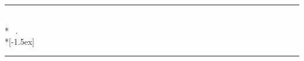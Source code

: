 

{\topsep}{\topsep}%
{}{}%
{\bfseries}{}
{\newline}
{%
  \rule{\textwidth}{0.4pt}\\*%
  ~.\\*[-1.5ex]%
  \rule{\textwidth}{0.4pt}}%

\theoremstyle{mydef}

\newtheorem{theorem}{Theorem}[section]
\newtheorem{corollary}{Corollary}[section]
\newtheorem{lemma}{Lemma}[section]
\newtheorem{definition}{Definition}[section]
\newtheorem{example}{Example}[section]
\newtheorem{assumption}{Assumption}[section]


\let\cleverefCref\Cref
\RenewDocumentCommand{\Cref}{o m}{%
  \IfNoValueTF{#1}%
    {\cleverefCref{#2}}%
    {\hyperref[#2]{#1}}%
}
